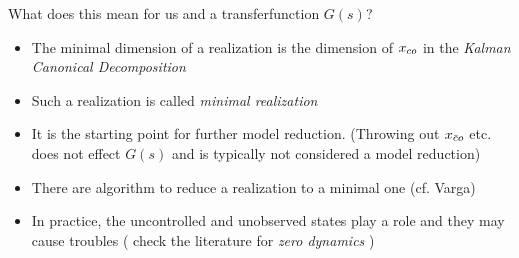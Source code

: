 \documentclass[a4paper,10pt]{article}
\theoremstyle{definition}
\begin{document}
What does this mean for us and a transferfunction $G(s)$?
\begin{itemize}
	\item The minimal dimension of a realization is the dimension of $x_{co}$ in the \emph{Kalman Canonical Decomposition}
	\item Such a realization is called \emph{minimal realization}
	\item It is the starting point for further model reduction. (Throwing out $x_{\bar c o}$ etc. does not effect $G(s)$ and is typically not considered a model reduction)
	\item There are algorithm to reduce a realization to a minimal one (cf. Varga)
	\item In practice, the uncontrolled and unobserved states play a role and they may cause troubles ( check the literature for \emph{zero dynamics} )
\end{itemize}



\end{document}
